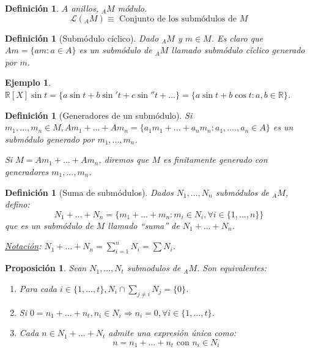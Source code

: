 \documentclass[11pt,a4paper]{article}
\theoremstyle{break}
\newtheorem{example}[theorem]{Ejemplo}
\newtheorem{definition}[theorem]{Definición}
\newtheorem{proposition}[theorem]{Proposición}
\begin{document}
\begin{definition}
$A$ anillos, $_{A}M$ módulo.
$$\mathcal{L}(_{A}M) \equiv \text{ Conjunto de los submódulos de } M$$
\end{definition}

\begin{definition}[Submódulo cíclico]
Dado $_{A}M$ y $m \in M$. Es claro que $Am = \{am: a \in A\}$ es un submódulo de $_{A}M$ llamado submódulo cíclico generado por $m$.
\end{definition}

\begin{example}
$\mathbb{R}[X] \sin t = \{a \sin t + b \sin't + c \sin''t + ...\} = \{a \sin t + b \cos t: a, b \in \mathbb{R}\}$.
\end{example}

\begin{definition}[Generadores de un submódulo]
Si $m_{1}, ..., m_{n} \in M, Am_{1} + ... + Am_{n} = \{a_{1}m_{1} + ... + a_{n}m_{n}: a_{1}, ...., a_{n} \in A\}$ es un submódulo generado por $m_{1}, ..., m_{n}$.

Si $M = Am_{1} + ... + Am_{n}$, diremos que $M$ es finitamente generado con generadores $m_{1}, ..., m_{n}$.
\end{definition}

\begin{definition}[Suma de submódulos]
Dados $N_{1}, ..., N_{n}$ submódulos de $_{A}M$, defino:
$$N_{1} + ... + N_{n} = \{m_{1} + ... + m_{n}: m_{i} \in N_{i}, \forall i \in \{1, ..., n\}\}$$
que es un submódulo de $M$ llamado ``suma'' de $N_{1} + ... + N_{n}$.

\underline{Notación}: $N_{1} + ... + N_{n} = \sum_{i=1}^{n} N_{i} = \sum N_{i}$.
\end{definition}

\begin{proposition}
Sean $N_{1}, ..., N_{t}$ submodulos de $_{A}M$. Son equivalentes:
\begin{enumerate}[label = \alph*)]
\item Para cada $i \in \{1, ..., t\}, N_{i} \cap \sum_{j \neq i} N_{j} = \{0\}$.
\item Si $0 = n_{1} + ... + n_{t}, n_{i} \in N_{i} \Rightarrow n_{i} = 0, \forall i \in \{1, ..., t\}$.
\item Cada $n \in N_{1} + ... + N_{t}$ admite una expresión única como:
$$n = n_{1} + ... + n_{t} \text{ con } n_{i} \in N_{i}$$
\end{enumerate}
\end{proposition}
 
\end{document}
